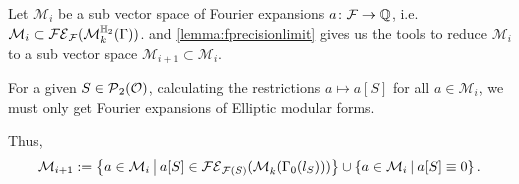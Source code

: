 \begin{remark}
\label{remark:algo-mainstep1}
Let $\mathcal{M}_i$ be a sub vector space of Fourier expansions $a \colon \mathcal{F} \rightarrow \mathbb{Q}$, i.e. $\mathcal{M}_i \subset \mathcal{FE}_{\mathcal{F}}(\operatorname{\mathcal{M}}^{\mathbb{H}_{2}}_k (\Gamma))$.
 and \cref{lemma:fprecisionlimit} gives us the tools to reduce $\mathcal{M}_i$ to a sub vector space $\mathcal{M}_{i+1} \subset \mathcal{M}_i$.

For a given $S \in \operatorname{\mathcal{P}}_2(\mathcal{O})$, calculating the restrictions $a \mapsto a[S]$ for all $a \in \mathcal{M}_i$, we must only get Fourier expansions of Elliptic modular forms.

Thus,
\[  \mathcal{M}_{i+1} := \Set{a \in \mathcal{M}_i}{a[S] \in \FE_{\F(S)}(\ESpace{k}{\Gamma_0(l_S)})} \cup \Set{a \in \mathcal{M}_i}{a[S] \equiv 0}. \]
\end{remark}

